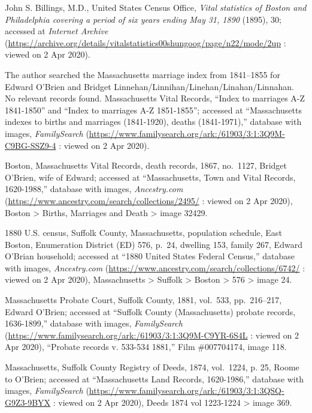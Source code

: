 \begin{thebibliography}{999}
	John S. Billings, M.D., United States Census Office, \textit{Vital statistics of Boston and Philadelphia covering a period of six years ending May 31, 1890} (1895), 30; accessed at \textit{Internet Archive} (\url{https://archive.org/details/vitalstatistics00shungoog/page/n22/mode/2up} : viewed on 2 Apr 2020). 
	
	The author searched the Massachusetts marriage index from 1841--1855 for Edward O'Brien and Bridget Linnehan/Linnihan/Linehan/Linahan/Linnahan. No relevant records found.	
	Massachusetts Vital Records, ``Index to marriages A-Z 1841-1850'' and ``Index to marriages A-Z 1851-1855''; accessed at ``Massachusetts indexes to births and marriages (1841-1920), deaths (1841-1971),'' database with images, \textit{FamilySearch} (\url{https://www.familysearch.org/ark:/61903/3:1:3Q9M-C9BG-SSZ9-4} : viewed on 2 Apr 2020).
	
	Boston, Massachusetts Vital Records, death records, 1867, no.\ 1127, Bridget O'Brien, wife of Edward; accessed at ``Massachusetts, Town and Vital Records, 1620-1988,'' database with images, \textit{Ancestry.com} (\url{https://www.ancestry.com/search/collections/2495/} : viewed on 2 Apr 2020), Boston > Births, Marriages and Death > image 32429.
	
	1880 U.S. census, Suffolk County, Massachusetts, population schedule, East Boston, Enumeration District (ED) 576, p.\ 24, dwelling 153, family 267, Edward O'Brian household; accessed at ``1880 United States Federal Census,'' database with images, \textit{Ancestry.com} (\url{https://www.ancestry.com/search/collections/6742/} : viewed on 2 Apr 2020), Massachusetts > Suffolk > Boston > 576 > image 24.
	
	Massachusetts Probate Court, Suffolk County, 1881, vol.\ 533, pp.\ 216--217, Edward O'Brien; accessed at ``Suffolk County (Massachusetts) probate records, 1636-1899,'' database with images, \textit{FamilySearch} (\url{https://www.familysearch.org/ark:/61903/3:1:3Q9M-C9YR-6S4L} : viewed on 2 Apr 2020), ``Probate records v. 533-534 1881,'' Film \#007704174, image 118.
	
	Massachusetts, Suffolk County Registry of Deeds, 1874, vol.\ 1224, p. 25, Roome to O'Brien; accessed at ``Massachusetts Land Records, 1620-1986,'' database with images, \textit{FamilySearch} (\url{https://www.familysearch.org/ark:/61903/3:1:3QSQ-G9Z3-9BYX} : viewed on 2 Apr 2020), Deeds 1874 vol 1223-1224 > image 369.
	

\end{thebibliography}
